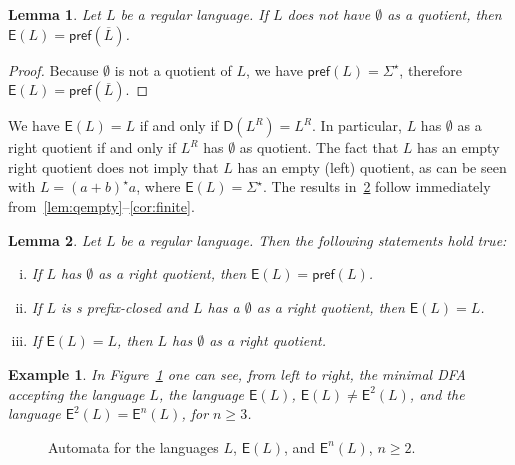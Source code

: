 \documentclass{article}
\newtheorem{lemma}{Lemma}
\newtheorem{example}{Example}
\newcommand{\dfa}{DFA\xspace}
\newcommand{\comp}[1]{\overline{#1}}
\newcommand{\preff}[1]{\mathsf{pref}(#1)}
\newcommand{\dis}[1]{\mathsf{D}(#1)}
\newcommand{\dpre}[1]{\mathsf{E}(#1)}
\newcommand{\dpren}[2]{\mathsf{E}^{#2}(#1)}
\begin{document}
\begin{lemma}
\label{lem:qepref}
Let $L$ be a regular language. If $L$ does not have $\emptyset$ as a quotient, then  $\dpre{L}=\preff{\comp{L}}$.
\end{lemma}
\begin{proof}
Because $\emptyset$ is not a quotient of $L$, we have
 $\preff{L}=\Sigma^\star$, therefore $\dpre{L}=\preff{\comp{L}}$.
\end{proof}

We have  $\dpre{L}=L$ if and only if $\dis{L^R}=L^R$. 
In particular, $L$ has $\emptyset$ as a right quotient if and only if  $L^R$ has $\emptyset$ as quotient.
The fact that  $L$ has an empty  right quotient does not imply that $L$ has an empty (left) quotient, as can be seen with $L=(a+b)^\star a$, where  $\dpre{L}=\Sigma^\star$.
 The results in~\ref{lem:prelemma} follow immediately from~\ref{lem:qempty}--\ref{cor:finite}. 

\begin{lemma}
\label{lem:prelemma}
Let $L$ be a regular language. Then the following statements hold true:
\begin{enumerate}[i)] 
\item If $L$ has $\emptyset$ as a right quotient, then  $\dpre{L}=\preff{L}$.
\item If $L$ is s prefix-closed and  $L$ has a $\emptyset$ as a right quotient, then $\dpre{L}=L$.
\item If  $\dpre{L}=L$, then $L$ has $\emptyset$ as a right quotient.
\end{enumerate}
\end{lemma}
\begin{example}
\label{ex:prefe2}
In Figure~\ref{fig:prefe2} one can see, from left to right, the minimal  \dfa accepting the language $L$, 
the language $\dpre{L}$, $\dpre{L}\not=\dpren{L}{2}$, and the language $\dpren{L}{2}=\dpren{L}{n}$, for $n\ge 3$.
\end{example}

\begin{figure}[h!]
\begin{center}
\quad\quad{} \end{center}
\caption{Automata for the languages $L$, $\dpre{L}$, and $\dpren{L}{n}$, $n\ge 2$.}

\label{fig:prefe2} 
\end{figure}
\end{document}
